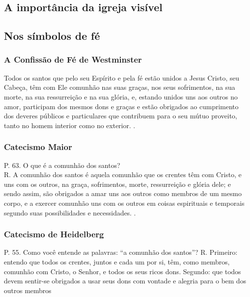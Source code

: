 \subsection{A importância da igreja visível}

\subsection{Nos símbolos de fé}

\subsubsection{A Confissão de Fé de Westminster} 
\begin{citacao}
Todos os santos que pelo seu Espírito e pela fé estão unidos a Jesus Cristo, seu Cabeça, têm com Ele comunhão nas suas graças, nos seus sofrimentos, na sua morte, na sua ressurreição e na sua glória, e, estando unidos uns aos outros no amor, participam dos mesmos dons e graças e estão obrigados ao cumprimento dos deveres públicos e particulares que contribuem para o seu mútuo proveito, tanto no homem interior como no exterior. \cite{cfw}.
\end{citacao}

\subsubsection{Catecismo Maior} 
\begin{citacao}
P. 63. O que é a comunhão dos santos? \\
R. A comunhão dos santos é aquela comunhão que os crentes têm com Cristo, e uns com os outros, na graça, sofrimentos, morte, ressurreição e glória dele; e sendo assim, são obrigados a amar uns aos outros como membros de um mesmo corpo, e a exercer comunhão uns com os outros em coisas espirituais e temporais segundo suas possibilidades e necessidades. \cite{catecismoMaior}.
\end{citacao}

\subsubsection{Catecismo de Heidelberg}
\begin{citacao}
P. 55. Como você entende as palavras: ``a comunhão dos santos''?
R. Primeiro: entendo que todos os crentes, juntos e cada um por si, têm, como membros, comunhão com Cristo, o Senhor, e todos os seus ricos dons. Segundo: que todos devem sentir-se obrigados a usar seus dons com vontade e alegria para o bem dos outros membros \cite{heidelberg}
\end{citacao}

